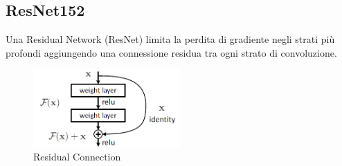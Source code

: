 \begin{figure}[!h]
                \caption{}
                \label{DenseNet121 Confusion Matrix and Predictions}
            \end{figure}
        \newpage
   
    \subsection{ResNet152}
    \label{ResNet152} 
    Una Residual Network (ResNet) \cite{he2015deep} limita la perdita di gradiente negli strati più profondi aggiungendo una connessione residua tra ogni strato di convoluzione.
        \begin{figure}[!h]
            \centering
            \includegraphics[width=0.5\textwidth]{Images/Modelli/ResNet152/Residual Connection.png}
            \caption{Residual Connection}
            \label{Residual Connection}
        \end{figure}
    

